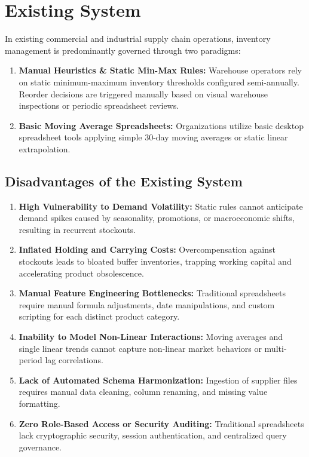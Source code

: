 \documentclass[12pt,a4paper]{report}
\begin{document}
\section{Existing System}
In existing commercial and industrial supply chain operations, inventory management is predominantly governed through two paradigms:
\begin{enumerate}
    \item \textbf{Manual Heuristics \& Static Min-Max Rules:} Warehouse operators rely on static minimum-maximum inventory thresholds configured semi-annually. Reorder decisions are triggered manually based on visual warehouse inspections or periodic spreadsheet reviews.
    \item \textbf{Basic Moving Average Spreadsheets:} Organizations utilize basic desktop spreadsheet tools applying simple 30-day moving averages or static linear extrapolation.
\end{enumerate}

\subsection*{Disadvantages of the Existing System}
\begin{enumerate}
    \item \textbf{High Vulnerability to Demand Volatility:} Static rules cannot anticipate demand spikes caused by seasonality, promotions, or macroeconomic shifts, resulting in recurrent stockouts.
    \item \textbf{Inflated Holding and Carrying Costs:} Overcompensation against stockouts leads to bloated buffer inventories, trapping working capital and accelerating product obsolescence.
    \item \textbf{Manual Feature Engineering Bottlenecks:} Traditional spreadsheets require manual formula adjustments, date manipulations, and custom scripting for each distinct product category.
    \item \textbf{Inability to Model Non-Linear Interactions:} Moving averages and single linear trends cannot capture non-linear market behaviors or multi-period lag correlations.
    \item \textbf{Lack of Automated Schema Harmonization:} Ingestion of supplier files requires manual data cleaning, column renaming, and missing value formatting.
    \item \textbf{Zero Role-Based Access or Security Auditing:} Traditional spreadsheets lack cryptographic security, session authentication, and centralized query governance.
\end{enumerate}
\end{document}
